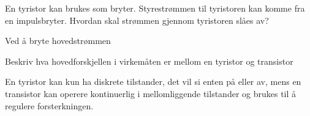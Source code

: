 \begin{question}[name=Spørsmål, topic=tyristor]
	En tyristor kan brukes som bryter. Styrestrømmen til tyristoren kan komme fra en impulsbryter. Hvordan skal strømmen gjennom tyristoren slåes av?
\end{question}

\vspace{0.5cm} %

\begin{solution}[name=Løsningsforslag]
	Ved å bryte hovedstrømmen
\end{solution}

\vspace{0.5cm} %

\begin{question}[name=Spørsmål, topic=tyristor]
Beskriv hva hovedforskjellen i virkemåten er mellom en tyristor og transistor
\end{question}

\vspace{0.5cm} %

\begin{solution}[name=Løsningsforslag]
En tyristor kan kun ha diskrete tilstander, det vil si enten på eller av, mens en transistor kan operere kontinuerlig i mellomliggende tilstander og brukes til å regulere forsterkningen.
\end{solution}


